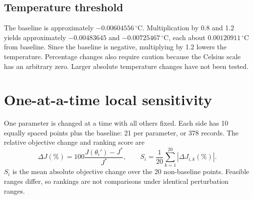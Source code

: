 \documentclass[11pt,a4paper]{article}
\newcommand{\param}[1]{\texttt{\detokenize{#1}}}
\begin{document}
\subsection{Temperature threshold}
The baseline \param{snw_att} is approximately $-0.00604556\,^\circ\mathrm C$. Multiplication by 0.8 and 1.2 yields approximately $-0.00483645$ and $-0.00725467\,^\circ\mathrm C$, each about $0.00120911\,^\circ\mathrm C$ from baseline. Since the baseline is negative, multiplying by 1.2 lowers the temperature. Percentage changes also require caution because the Celsius scale has an arbitrary zero. Larger absolute temperature changes have not been tested.
\section{One-at-a-time local sensitivity}
One parameter is changed at a time with all others fixed. Each side has 10 equally spaced points plus the baseline: 21 per parameter, or 378 records. The relative objective change and ranking score are
\[\Delta J(\%)=100\frac{J(\theta_i')-J^*}{J^*},\qquad S_i=\frac{1}{20}\sum_{k=1}^{20}|\Delta J_{i,k}(\%)|.\]
\(S_i\) is the mean absolute objective change over the 20 non-baseline points. Feasible ranges differ, so rankings are not comparisons under identical perturbation ranges.
\end{document}
